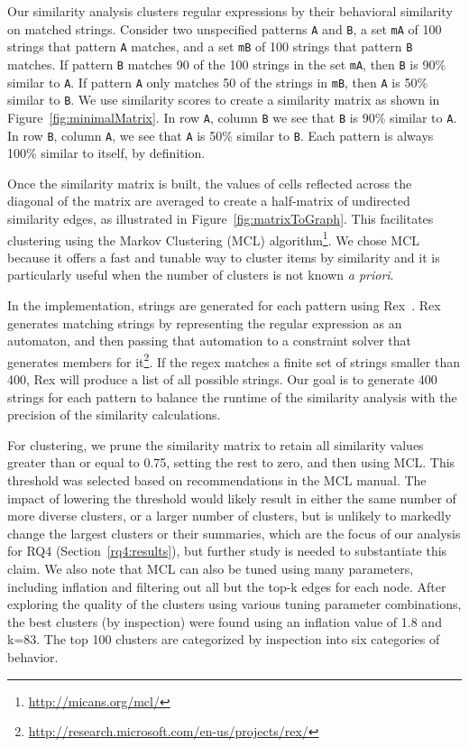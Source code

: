 Our similarity analysis clusters regular expressions by their behavioral similarity on matched strings.
Consider two unspecified patterns {\tt A} and {\tt B}, a set {\tt mA} of 100 strings that pattern {\tt A} matches, and a set {\tt mB} of 100 strings that pattern {\tt B} matches.
If pattern {\tt B} matches 90 of the 100 strings in the set {\tt mA}, then {\tt B} is 90\% similar to {\tt A}.
If pattern {\tt A} only matches 50 of the strings in {\tt mB}, then {\tt A} is 50\% similar to {\tt B}.
We use similarity scores to create a similarity matrix as shown in Figure~\ref{fig:minimalMatrix}.
In row {\tt A}, column {\tt B} we see that {\tt B} is 90\% similar to {\tt A}.
In row {\tt B}, column {\tt A}, we see that {\tt A} is 50\% similar to {\tt B}.  Each pattern is always 100\% similar to itself, by definition.

Once the similarity matrix is built, the values of cells reflected across the diagonal of the matrix are averaged to create a half-matrix of undirected similarity edges, as illustrated in Figure~\ref{fig:matrixToGraph}.
This facilitates clustering using the  Markov Clustering (MCL) algorithm\footnote{\url{http://micans.org/mcl/}}.
We chose MCL  because it offers a fast and tunable way to cluster items by similarity and it is particularly useful when the number of clusters is not known \emph{a priori}.


In the implementation, strings are generated for each pattern using Rex~\cite{rex}.  Rex generates matching strings by representing the regular expression as an automaton, and then passing that automation to a constraint solver that generates members for it\footnote{\url{http://research.microsoft.com/en-us/projects/rex/}}.  If the regex matches a finite set of strings smaller than 400, Rex will produce a list of all possible strings.
Our goal is to generate 400 strings for each pattern to balance the runtime of the similarity analysis with the precision of the similarity calculations.


For clustering, we prune the similarity matrix to retain all similarity values greater than or equal to 0.75, setting the rest to zero, and then using MCL.
This threshold was selected based on recommendations in the MCL manual. The impact of lowering the threshold would likely result  in either the same number of more diverse clusters, or a larger number of clusters, but is unlikely to markedly change the largest clusters or their summaries, which are the focus of our analysis for RQ4 (Section~\ref{rq4:results}), but further study is needed to substantiate this claim.
We also note that MCL can also be tuned using many parameters, including inflation and filtering out all but the top-k edges for each node.
After exploring the quality of the clusters using various tuning parameter combinations, the best clusters (by inspection) were found using an inflation value of 1.8 and k=83.   The top 100 clusters are categorized by inspection into six categories of behavior. %

